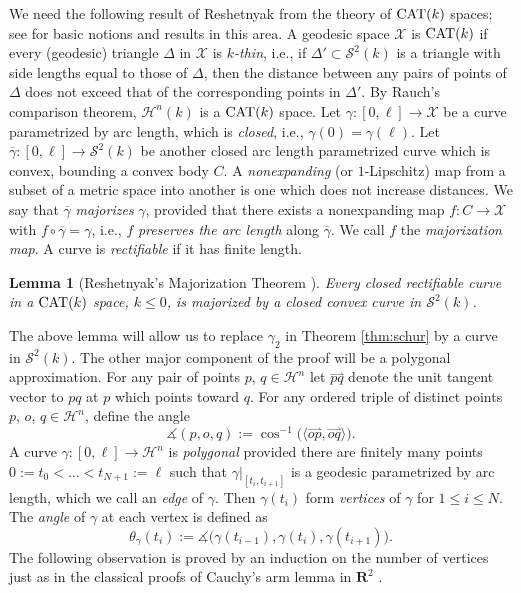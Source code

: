 \documentclass[11pt]{amsart}
\newtheorem{lemma}[theorem]{Lemma}
\theoremstyle{definition}
\newcommand{\ol}{\overline}
\newcommand{\R}{\mathbf{R}}
\begin{document}
We need the following result of Reshetnyak from the theory of $\textup{CAT}(k)$ spaces; see \cite{bridson-haefliger1999,akp2019b,bbi2001} for basic notions and results in this area.
A geodesic space $\mathcal{X}$ is $\textup{CAT}(k)$ if every (geodesic) triangle $\Delta$ in $\mathcal{X}$ is \emph{$k$-thin}, i.e., if $\Delta'\subset\mathcal{S}^2(k)$ is a triangle with side lengths equal to those of $\Delta$, then the distance between any pairs of points of $\Delta$ does not exceed that of the corresponding points in $\Delta'$. By Rauch's comparison theorem,  $\mathcal{H}^n(k)$ is a $\textup{CAT}(k)$ space. Let $\gamma\colon [0,\ell]\to \mathcal{X}$ be a curve parametrized by arc length, which is \emph{closed}, i.e., $\gamma(0)=\gamma(\ell)$. Let $\ol\gamma \colon [0,\ell]\to \mathcal{S}^2(k)$ be another closed arc length parametrized curve which is convex, bounding a convex body $C$. A \emph{nonexpanding} (or $1$-Lipschitz) map from a subset of a metric space into another is one which does not increase distances. We say that $\ol\gamma$ \emph{majorizes} $\gamma$, provided that there exists a nonexpanding map $f\colon C\to\mathcal{X}$ with $f\circ \ol\gamma=\gamma$, i.e., $f$ \emph{preserves the arc length} along $\ol\gamma$. We call $f$ the \emph{majorization map}. A curve is \emph{rectifiable} if it has finite length. 

\begin{lemma}[Reshetnyak's Majorization Theorem \cites{akp2019,reshetnyak1968}]\label{lem:reshetnyak}
Every closed rectifiable curve in a $\textup{CAT}(k)$ space, $k\leq 0$, is majorized by a closed convex curve in $\mathcal{S}^2(k)$.
\end{lemma}

The above lemma will allow us to replace $\gamma_2$ in Theorem \ref{thm:schur} by a curve in $\mathcal{S}^2(k)$. The other major component of the proof will be a polygonal approximation. For any pair of points $p$, $q\in\mathcal{H}^n$ let $\overset{\rightharpoonup}{pq}$ denote the unit tangent vector to $pq$ at $p$ which points toward $q$.  For any ordered triple of distinct points $p$, $o$, $q\in\mathcal{H}^n$,  define the angle
$$
\measuredangle(p,o,q):=\cos^{-1}\big(\big\langle \overset{\rightharpoonup}{op}, \overset{\rightharpoonup}{oq}\big\rangle\big).
$$ 
A curve $\gamma\colon [0,\ell]\to \mathcal{H}^n$ is \emph{polygonal} provided there are finitely many points $0:=t_0< \dots<t_{N+1}:=\ell$ such that $\gamma|_{[t_{i}, t_{i+1}]}$ is a geodesic parametrized by arc length, which we call an \emph{edge} of $\gamma$. Then $\gamma(t_i)$ form \emph{vertices} of $\gamma$ for $1\leq i\leq N$. The \emph{angle} of $\gamma$ at each vertex is defined as 
$$
\theta_\gamma(t_i):=\measuredangle\big(\gamma(t_{i-1}),\gamma(t_i),\gamma(t_{i+1})\big).
$$
The following observation is proved by an induction on the number of vertices just as in the classical proofs of Cauchy's  arm lemma in $\R^2$  \cites{aigner-ziegler1999,sabitov2004}.
\end{document}
